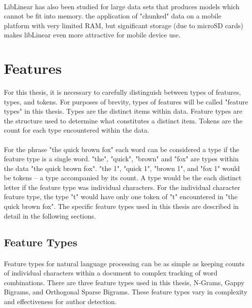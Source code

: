 			\paragraph{} LibLinear has also been studied for large data sets that produces models which cannot be fit into memory.  the application of "chunked" data on a mobile platform with very limited RAM, but significant storage (due to microSD cards) makes libLinear even more attractive for mobile device use.
			
\section {Features}
\paragraph*{} For this thesis, it is necessary to carefully distinguish between types of features, types, and tokens.  For purposes of brevity, types of features will be called "feature types" in this thesis.  Types are the distinct items within data.  Feature types are the structure used to determine what constitutes a distinct item. Tokens are the count for each type encountered within the data.
\paragraph*{} For the phrase "the quick brown fox" each word can be considered a type if the feature type is a single word.  "the", "quick", "brown" and "fox" are types within the data "the quick brown fox".  "the 1", "quick 1", "brown 1", and "fox 1" would be tokens -- a type accompanied by its count. A type would be the each distinct letter if the feature type was individual characters.  For the individual character feature type, the type "t" would have only one token of "t" encountered in "the quick brown fox".  The specific feature types used in this thesis are described in detail in the following sections.

	\subsection {Feature Types}
	\paragraph{} Feature types for natural language processing can be as simple as keeping counts of individual characters within a document to complex tracking of word combinations.  There are three feature types used in this thesis, N-Grams, Gappy Bigrams, and Orthogonal Sparse Bigrams.  These feature types vary in complexity and effectiveness for author detection.

